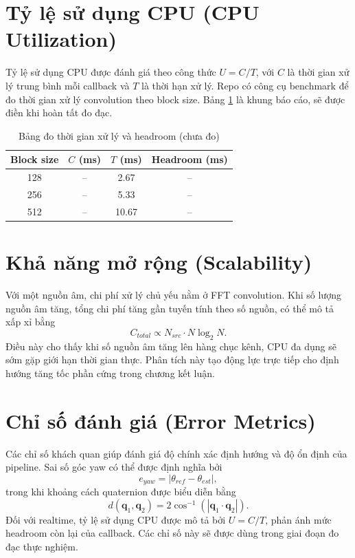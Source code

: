 \section{Tỷ lệ sử dụng CPU (CPU Utilization)}
Tỷ lệ sử dụng CPU được đánh giá theo công thức $U = C/T$, với $C$ là thời gian xử lý trung bình mỗi callback và $T$ là thời hạn xử lý. Repo có công cụ benchmark để đo thời gian xử lý convolution theo block size. Bảng \cref{tab:cpu_util} là khung báo cáo, sẽ được điền khi hoàn tất đo đạc.

\begin{table}[H]
\centering
\caption{Bảng đo thời gian xử lý và headroom (chưa đo)}
\label{tab:cpu_util}
\vspace{0.2cm}
\renewcommand{\arraystretch}{1.2}
\begin{tabular}{cccc}
\toprule
\textbf{Block size} & \textbf{$C$ (ms)} & \textbf{$T$ (ms)} & \textbf{Headroom (ms)} \\
\midrule
128 & -- & 2.67 & -- \\
256 & -- & 5.33 & -- \\
512 & -- & 10.67 & -- \\
\bottomrule
\end{tabular}
\end{table}

\section{Khả năng mở rộng (Scalability)}
Với một nguồn âm, chi phí xử lý chủ yếu nằm ở FFT convolution. Khi số lượng nguồn âm tăng, tổng chi phí tăng gần tuyến tính theo số nguồn, có thể mô tả xấp xỉ bằng
\begin{equation}
    C_{total} \propto N_{src} \cdot N\log_2 N.
\end{equation}
Điều này cho thấy khi số nguồn âm tăng lên hàng chục kênh, CPU đa dụng sẽ sớm gặp giới hạn thời gian thực. Phân tích này tạo động lực trực tiếp cho định hướng tăng tốc phần cứng trong chương kết luận.

\section{Chỉ số đánh giá (Error Metrics)}
Các chỉ số khách quan giúp đánh giá độ chính xác định hướng và độ ổn định của pipeline. Sai số góc yaw có thể được định nghĩa bởi
\begin{equation}
    e_{yaw} = \left|\theta_{ref} - \theta_{est}\right|,
\end{equation}
trong khi khoảng cách quaternion được biểu diễn bằng
\begin{equation}
    d(\mathbf{q}_1,\mathbf{q}_2)=2\cos^{-1}\left(|\mathbf{q}_1\cdot\mathbf{q}_2|\right).
\end{equation}
Đối với realtime, tỷ lệ sử dụng CPU được mô tả bởi $U = C/T$, phản ánh mức headroom còn lại của callback. Các chỉ số này sẽ được dùng trong giai đoạn đo đạc thực nghiệm.


